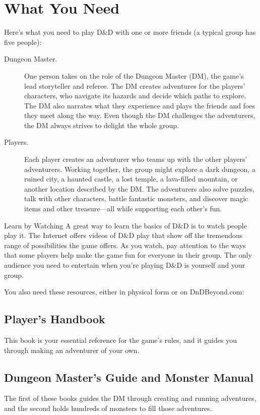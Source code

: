 \documentclass[10pt,a4paper,twoside,bg=print,twocolumn,openany,nodeprecatedcode]{dndbook}
\begin{document}
\section{What You Need}
Here's what you need to play D\&D with one or more friends (a typical group has five people):


\begin{description}
\item[Dungeon Master.]
One person takes on the role of the Dungeon Master (DM), the game's lead storyteller and referee. The DM creates adventures for the players' characters, who navigate its hazards and decide which paths to explore. The DM also narrates what they experience and plays the friends and foes they meet along the way. Even though the DM challenges the adventurers, the DM always strives to delight the whole group.
\item[Players.]
Each player creates an adventurer who teams up with the other players' adventurers. Working together, the group might explore a dark dungeon, a ruined city, a haunted castle, a lost temple, a lava-filled mountain, or another location described by the DM. The adventurers also solve puzzles, talk with other characters, battle fantastic monsters, and discover magic items and other treasure—all while supporting each other's fun.
\end{description}

\begin{DndSidebar}[float=!b]{Learn by Watching}
A great way to learn the basics of D\&D is to watch people play it. The Internet offers videos of D\&D play that show off the tremendous range of possibilities the game offers. As you watch, pay attention to the ways that some players help make the game fun for everyone in their group. The only audience you need to entertain when you're playing D\&D is yourself and your group.



\end{DndSidebar}

You also need these resources, either in physical form or on DnDBeyond.com:

\subsection{Player's Handbook}
This book is your essential reference for the game's rules, and it guides you through making an adventurer of your own.

\subsection{Dungeon Master's Guide and Monster Manual}
The first of these books guides the DM through creating and running adventures, and the second holds hundreds of monsters to fill those adventures.
\end{document}
